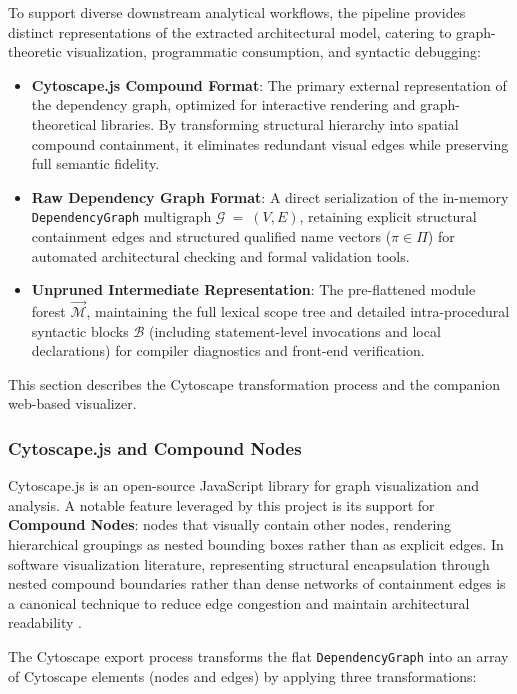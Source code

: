 To support diverse downstream analytical workflows, the pipeline provides
distinct representations of the extracted architectural model, catering to
graph-theoretic visualization, programmatic consumption, and
syntactic debugging:
\begin{itemize}
  \item \textbf{Cytoscape.js Compound Format}: The primary external
    representation
    of the dependency graph, optimized for interactive rendering and
    graph-theoretical
    libraries. By transforming structural hierarchy into spatial
    compound containment,
    it eliminates redundant visual edges while preserving full
    semantic fidelity.
  \item \textbf{Raw Dependency Graph Format}: A direct serialization of the
    in-memory \texttt{DependencyGraph} multigraph $\mathcal{G}\:{=}\:(V,
    E)$, retaining
    explicit structural containment edges and structured qualified name vectors
    ($\pi \in \Pi$) for automated architectural checking and formal
    validation tools.
  \item \textbf{Unpruned Intermediate Representation}: The pre-flattened module
    forest $\vec{\mathcal{M}}$, maintaining the full lexical scope
    tree and detailed
    intra-procedural syntactic blocks $\mathcal{B}$ (including statement-level
    invocations and local declarations) for compiler diagnostics and
    front-end verification.
\end{itemize}

This section describes the Cytoscape transformation process and the companion
web-based visualizer.

\subsubsection{Cytoscape.js and Compound Nodes}

Cytoscape.js is an open-source JavaScript library for graph
visualization and analysis. A notable feature leveraged by this
project is its support for \textbf{Compound Nodes}: nodes that
visually contain other nodes, rendering hierarchical groupings as
nested bounding boxes rather than as explicit edges. In software
visualization literature, representing structural encapsulation
through nested compound boundaries rather than dense networks of
containment edges is a canonical technique to reduce edge congestion
and maintain architectural readability \cite{dielh_software_2007}.

The Cytoscape export process transforms the flat
\texttt{DependencyGraph} into an array of Cytoscape elements (nodes
and edges) by applying three transformations:

